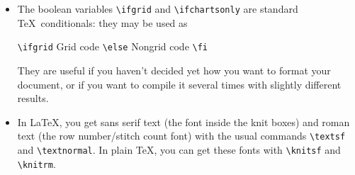\documentclass[draft]{amsart}
\begin{document}
\begin{itemize}
\item The boolean variables \verb|\ifgrid| and \verb|\ifchartsonly| are standard \TeX\ conditionals: they may be used as
\begin{center}\verb|\ifgrid| Grid code \verb|\else| Nongrid code \verb|\fi|
\end{center}

They are useful if you haven't decided yet how you want to format your document, or if you want to compile it several times with slightly different results.

\item In \LaTeX, you get sans serif text (the font inside the knit boxes) and roman text (the row number/stitch count font) with the usual commands \verb|\textsf| and \verb|\textnormal|. In plain \TeX, you can get these fonts with \verb|\knitsf| and \verb|\knitrm|.

\end{itemize}

\end{document}
